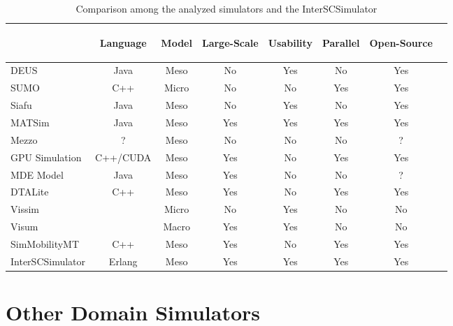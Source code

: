 \begin{table}[!htb]
\centering
{%
\begin{tabular}{|l|c|c|c|c|c|c|c|}
\hline

& \begin{sideways}Language \end{sideways} 
& \begin{sideways}Model \end{sideways} 
& \begin{sideways}Large-Scale \end{sideways} 
& \begin{sideways}Usability \end{sideways} 
& \begin{sideways}Parallel \end{sideways} 
& \begin{sideways}Open-Source \hspace{1cm}\end{sideways} 
\\
\hline
DEUS
& Java & Meso & No & Yes & No & Yes\\
SUMO
& C++ & Micro & No & No & Yes & Yes \\
Siafu
& Java & Meso & No & Yes & No & Yes\\
MATSim
& Java & Meso & Yes & Yes & Yes  & Yes \\
Mezzo
& ? & Meso & No & No & No  & ? \\
GPU Simulation
& C++/CUDA & Meso & Yes & No & Yes  & Yes \\
MDE Model
& Java & Meso & Yes & No & No  & ? \\
DTALite
& C++ & Meso & Yes & No & Yes  & Yes \\
Vissim
&  & Micro & No & Yes & No & No \\
Visum
&  & Macro & Yes & Yes & No  & No \\
SimMobilityMT
& C++ & Meso & Yes & No & Yes & Yes \\
InterSCSimulator
& Erlang & Meso & Yes & Yes & Yes & Yes \\
\hline
\end{tabular}}
\caption{Comparison among the analyzed simulators and the InterSCSimulator\label{table:comparacao_simuladores}}
\end{table}%

\section{Other Domain Simulators}
\label{ref:outros_dominios}

